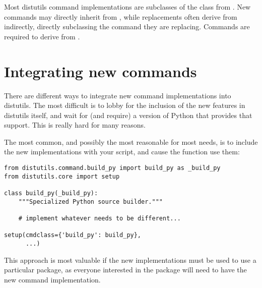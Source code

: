 \documentclass{manual}
\begin{document}
Most distutils command implementations are subclasses of the
 class from .  New commands
may directly inherit from , while replacements often
derive from  indirectly, directly subclassing the
command they are replacing.  Commands are required to derive from
.






\section{Integrating new commands}

There are different ways to integrate new command implementations into
distutils.  The most difficult is to lobby for the inclusion of the
new features in distutils itself, and wait for (and require) a version
of Python that provides that support.  This is really hard for many
reasons.

The most common, and possibly the most reasonable for most needs, is
to include the new implementations with your  script,
and cause the  function use them:

\begin{verbatim}
from distutils.command.build_py import build_py as _build_py
from distutils.core import setup

class build_py(_build_py):
    """Specialized Python source builder."""

    # implement whatever needs to be different...

setup(cmdclass={'build_py': build_py},
      ...)
\end{verbatim}

This approach is most valuable if the new implementations must be used
to use a particular package, as everyone interested in the package
will need to have the new command implementation.
\end{document}
